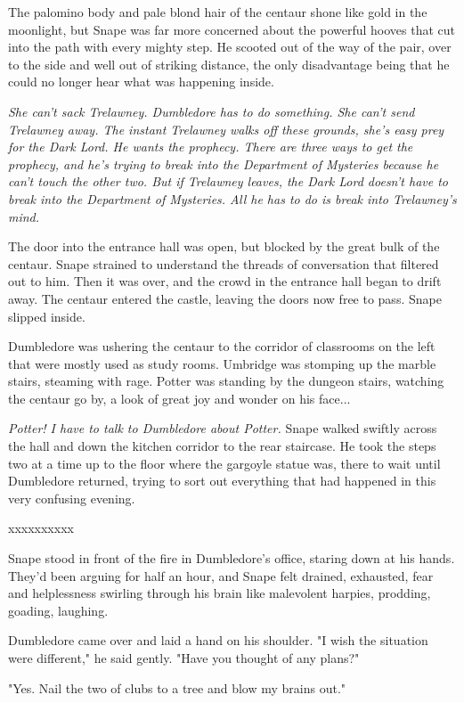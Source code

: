 \documentclass[a4paper,11pt]{article}
\begin{document}
The palomino body and pale blond hair of the centaur shone like gold in the moonlight, but Snape was far more concerned about the powerful hooves that cut into the path with every mighty step. He scooted out of the way of the pair, over to the side and well out of striking distance, the only disadvantage being that he could no longer hear what was happening inside.

\emph{She can't sack Trelawney. Dumbledore has to do something. She can't send Trelawney away. The instant Trelawney walks off these grounds, she's easy prey for the Dark Lord. He wants the prophecy. There are three ways to get the prophecy, and he's trying to break into the Department of Mysteries because he can't touch the other two. But if Trelawney leaves, the Dark Lord doesn't have to break into the Department of Mysteries. All he has to do is break into Trelawney's mind.}

The door into the entrance hall was open, but blocked by the great bulk of the centaur. Snape strained to understand the threads of conversation that filtered out to him. Then it was over, and the crowd in the entrance hall began to drift away. The centaur entered the castle, leaving the doors now free to pass. Snape slipped inside.

Dumbledore was ushering the centaur to the corridor of classrooms on the left that were mostly used as study rooms. Umbridge was stomping up the marble stairs, steaming with rage. Potter was standing by the dungeon stairs, watching the centaur go by, a look of great joy and wonder on his face...

\emph{Potter! I have to talk to Dumbledore about Potter.} Snape walked swiftly across the hall and down the kitchen corridor to the rear staircase. He took the steps two at a time up to the floor where the gargoyle statue was, there to wait until Dumbledore returned, trying to sort out everything that had happened in this very confusing evening.

xxxxxxxxxx

Snape stood in front of the fire in Dumbledore's office, staring down at his hands. They'd been arguing for half an hour, and Snape felt drained, exhausted, fear and helplessness swirling through his brain like malevolent harpies, prodding, goading, laughing.

Dumbledore came over and laid a hand on his shoulder. "I wish the situation were different," he said gently. "Have you thought of any plans?"

"Yes. Nail the two of clubs to a tree and blow my brains out."
\end{document}
